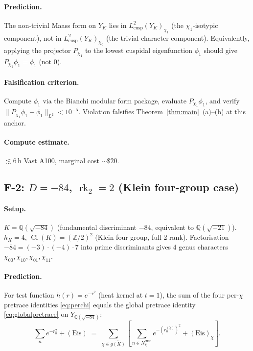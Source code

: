 \documentclass[11pt,a4paper,reqno]{amsart}
\theoremstyle{definition}
\DeclareMathOperator{\Cl}{Cl}
\DeclareMathOperator{\rk}{rk}
\newcommand{\QQ}{\mathbb{Q}}
\newcommand{\ZZ}{\mathbb{Z}}
\newcommand{\YK}{Y_K}
\newcommand{\dualgK}{\widehat{g(K)}}
\newcommand{\Lcusp}{L^2_{\mathrm{cusp}}}
\begin{document}
\paragraph{Prediction.}
The non-trivial Maass form on $\YK$ lies in $\Lcusp(\YK)_{\chi_1}$ (the $\chi_1$-isotypic component), not in $\Lcusp(\YK)_{\chi_0}$ (the trivial-character component). Equivalently, applying the projector $P_{\chi_1}$ to the lowest cuspidal eigenfunction $\phi_1$ should give $P_{\chi_1}\phi_1=\phi_1$ (not $0$).

\paragraph{Falsification criterion.}
Compute $\phi_1$ via the Bianchi modular form package, evaluate $P_{\chi_1}\phi_1$, and verify $\|P_{\chi_1}\phi_1-\phi_1\|_{L^2}<10^{-5}$. Violation falsifies Theorem~\ref{thm:main}~(a)--(b) at this anchor.

\paragraph{Compute estimate.}
$\lesssim 6$\,h Vast A100, marginal cost $\sim\$20$.

\subsection{F-2: $D=-84$, $\rk_2=2$ (Klein four-group case)}\label{ss:F2}

\paragraph{Setup.}
$K=\QQ(\sqrt{-84})$ (fundamental discriminant $-84$, equivalent to $\QQ(\sqrt{-21})$). $h_K=4$, $\Cl(K)=(\ZZ/2)^2$ (Klein four-group, full 2-rank). Factorisation $-84=(-3)\cdot(-4)\cdot 7$ into prime discriminants gives 4 genus characters $\chi_{00},\chi_{10},\chi_{01},\chi_{11}$.

\paragraph{Prediction.}
For test function $h(r)=e^{-r^2}$ (heat kernel at $t=1$), the sum of the four per-$\chi$ pretrace identities \eqref{eq:perchi} equals the global pretrace identity \eqref{eq:globalpretrace} on $Y_{\QQ(\sqrt{-84})}$:
\begin{equation*}
  \sum_n e^{-r_n^2} + (\mathrm{Eis})
  \;=\; \sum_{\chi\in\dualgK}\!\left[\sum_{n\in N_\chi^{\mathrm{cusp}}} e^{-(r_n^{(\chi)})^2} + (\mathrm{Eis})_\chi\right].
\end{equation*}
\end{document}
